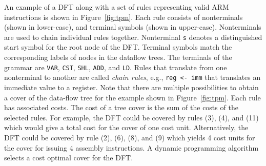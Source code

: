 An example of a DFT along with a set of rules representing valid ARM
instructions is shown in Figure~\ref{fig:tpm}. Each rule consists of
nonterminals (shown in lower-case), and terminal symbols (shown in
upper-case). Nonterminals are used to chain individual rules together.
Nonterminal \texttt{s} denotes a distinguished start symbol for the
root node of the DFT. Terminal symbols match the corresponding labels
of nodes in the dataflow trees. The terminals of the grammar are
\texttt{VAR}, \texttt{CST}, \texttt{SHL}, \texttt{ADD}, and
\texttt{LD}.  Rules that translate from one nonterminal to another are
called \emph{chain rules}, e.g., \texttt{reg <- imm} that translates
an immediate value to a register. Note that there are multiple
possibilities to obtain a cover of the data-flow tree for the example
shown in Figure~\ref{fig:tpm}.  Each rule has associated costs. The
cost of a tree cover is the sum of the costs of the selected
rules. For example, the DFT could be covered by rules (3), (4), and
(11) which would give a total cost for the cover of one cost
unit. Alternatively, the DFT could be covered by rule (2), (6), (8),
and (9) which yields 4 cost units for the cover for issuing 4 assembly
instructions. A dynamic programming algorithm selects a cost optimal
cover for the DFT.

